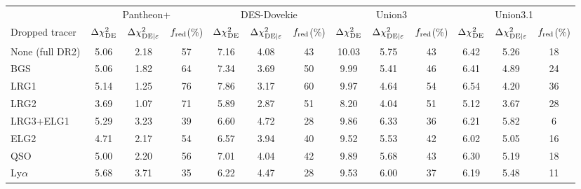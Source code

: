 \begin{tabular}{lcccccccccccc}
\hline\hline
 & \multicolumn{3}{c}{Pantheon+} & \multicolumn{3}{c}{DES-Dovekie} & \multicolumn{3}{c}{Union3} & \multicolumn{3}{c}{Union3.1} \\
Dropped tracer & $\Delta\chi^2_{\rm DE}$ & $\Delta\chi^2_{{\rm DE}|\varepsilon}$ & $f_{\rm red}$(\%) & $\Delta\chi^2_{\rm DE}$ & $\Delta\chi^2_{{\rm DE}|\varepsilon}$ & $f_{\rm red}$(\%) & $\Delta\chi^2_{\rm DE}$ & $\Delta\chi^2_{{\rm DE}|\varepsilon}$ & $f_{\rm red}$(\%) & $\Delta\chi^2_{\rm DE}$ & $\Delta\chi^2_{{\rm DE}|\varepsilon}$ & $f_{\rm red}$(\%) \\
\hline
None (full DR2) & 5.06 & 2.18 & 57 & 7.16 & 4.08 & 43 & 10.03 & 5.75 & 43 & 6.42 & 5.26 & 18 \\
BGS & 5.06 & 1.82 & 64 & 7.34 & 3.69 & 50 & 9.99 & 5.41 & 46 & 6.41 & 4.89 & 24 \\
LRG1 & 5.14 & 1.25 & 76 & 7.86 & 3.17 & 60 & 9.97 & 4.64 & 54 & 6.54 & 4.20 & 36 \\
LRG2 & 3.69 & 1.07 & 71 & 5.89 & 2.87 & 51 & 8.20 & 4.04 & 51 & 5.12 & 3.67 & 28 \\
LRG3+ELG1 & 5.29 & 3.23 & 39 & 6.60 & 4.72 & 28 & 9.86 & 6.33 & 36 & 6.21 & 5.82 & 6 \\
ELG2 & 4.71 & 2.17 & 54 & 6.57 & 3.94 & 40 & 9.52 & 5.53 & 42 & 6.02 & 5.05 & 16 \\
QSO & 5.00 & 2.20 & 56 & 7.01 & 4.04 & 42 & 9.89 & 5.68 & 43 & 6.30 & 5.19 & 18 \\
Ly$\alpha$ & 5.68 & 3.71 & 35 & 6.22 & 4.47 & 28 & 9.53 & 6.00 & 37 & 6.19 & 5.48 & 11 \\
\hline\hline
\end{tabular}
